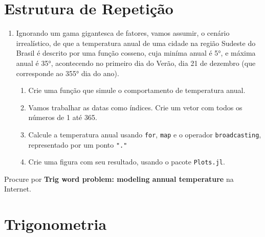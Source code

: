 \documentclass[
  letterpaper,
  DIV=11,
  numbers=noendperiod]{scrreprt}
\begin{document}
\hypertarget{estrutura-de-repetiuxe7uxe3o}{%
\section{Estrutura de Repetição}\label{estrutura-de-repetiuxe7uxe3o}}

\begin{enumerate}
\def\labelenumi{\arabic{enumi}.}
\setcounter{enumi}{2}
\item
  Ignorando um gama gigantesca de fatores, vamos assumir, o cenário
  irrealístico, de que a temperatura anual de uma cidade na região
  Sudeste do Brasil é descrito por uma função cosseno, cuja miníma anual
  é 5°, e máxima anual é 35°, acontecendo no primeiro dia do Verão, dia
  21 de dezembro (que corresponde ao 355° dia do ano).

  \begin{enumerate}
  \def\labelenumii{\alph{enumii}.}
  \item
    Crie uma função que simule o comportamento de temperatura anual.
  \item
    Vamos trabalhar as datas como índices. Crie um vetor com todos os
    números de 1 até 365.
  \item
    Calcule a temperatura anual usando \texttt{for}, \texttt{map} e o
    operador \texttt{broadcasting}, representado por um ponto
    \texttt{"."}
  \item
    Crie uma figura com seu resultado, usando o pacote
    \texttt{Plots.jl}.
  \end{enumerate}
\end{enumerate}

\begin{tcolorbox}[enhanced jigsaw, colbacktitle=quarto-callout-tip-color!10!white, coltitle=black, opacitybacktitle=0.6, breakable, colback=white, bottomtitle=1mm, left=2mm, arc=.35mm, leftrule=.75mm, colframe=quarto-callout-tip-color-frame, toprule=.15mm, opacityback=0, toptitle=1mm, titlerule=0mm, title=\textcolor{quarto-callout-tip-color}{\faLightbulb}\hspace{0.5em}{Dica}, rightrule=.15mm, bottomrule=.15mm]
Procure por \textbf{Trig word problem: modeling annual temperature} na
Internet.
\end{tcolorbox}

\hypertarget{trigonometria}{%
\section{Trigonometria}\label{trigonometria}}
\end{document}
